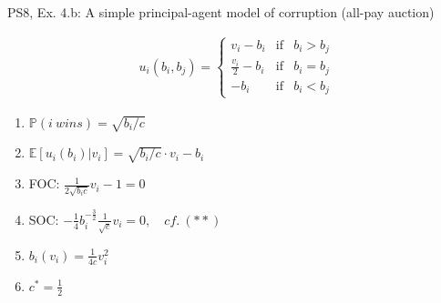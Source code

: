 \begin{frame}{PS8, Ex. 4.b: A simple principal-agent model of corruption (all-pay auction)}
\begin{multicols}{2}
\begin{align*}
        u_i(b_i,b_j)=\left\{\begin{array}{lcl}
          v_i-b_i           & \text{if} & b_i>b_j \\
          \frac{v_i}{2}-b_i & \text{if} & b_i=b_j \\
          -b_i              & \text{if} & b_i<b_j
        \end{array}\right.
      \end{align*} \vspace{-16pt}
      \begin{enumerate}
        \item $\mathbb{P}(i\ wins)=\sqrt{b_i/c}$
        \item $\mathbb{E}[u_i(b_i)|v_i]=\sqrt{b_i/c}\cdot v_i-b_i$
        \item FOC: $\frac{1}{2\sqrt{b_ic}}v_i-1=0$
        \item[] SOC: $-\frac{1}{4}b_i^{-\frac{3}{2}}\frac{1}{\sqrt{c}}v_i=0,\quad cf.\ (**)$
        \item $b_i(v_i)=\frac{1}{4c}v_i^2$
        \item $c^*=\frac{1}{2}$
      \end{enumerate}
      \vfill\null
    \end{multicols}
\end{frame}
